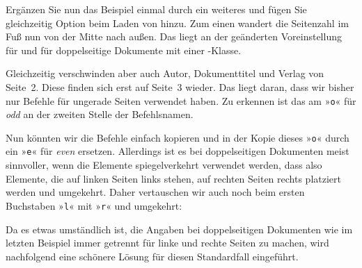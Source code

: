 \begin{Example}
  Ergänzen Sie nun das Beispiel einmal durch ein weiteres  und
  fügen Sie gleichzeitig Option
   beim Laden
  von  hinzu. Zum einen wandert die Seitenzahl im Fuß nun von
  der Mitte nach außen. Das liegt an der geänderten Voreinstellung für
   und
   für doppelseitige Dokumente
  mit einer \KOMAScript-Klasse.

  Gleichzeitig verschwinden aber auch Autor, Dokumenttitel und Verlag von
  Seite~2. Diese finden sich erst auf Seite~3 wieder. Das liegt daran, dass
  wir bisher nur Befehle für ungerade Seiten
  verwendet haben. Zu erkennen ist das am »\texttt{o}« für \emph{odd} an der
  zweiten Stelle der Befehlsnamen.

  Nun könnten wir die Befehle einfach kopieren und in der Kopie dieses
  »\texttt{o}« durch ein »\texttt{e}« für \emph{even}
  ersetzen. Allerdings ist es bei doppelseitigen Dokumenten meist sinnvoller,
  wenn die Elemente spiegelverkehrt verwendet werden, dass also Elemente, die
  auf linken Seiten links stehen, auf rechten Seiten rechts platziert werden
  und umgekehrt. Daher vertauschen wir auch noch beim ersten Buchstaben
  »\texttt{l}« mit »\texttt{r}« und umgekehrt:
\end{Example}%

Da es etwas umständlich ist, die Angaben bei doppelseitigen Dokumenten wie im
letzten Beispiel immer getrennt für linke und rechte Seiten zu machen, wird
nachfolgend eine schönere Lösung für diesen Standardfall eingeführt.

